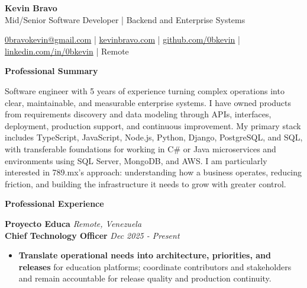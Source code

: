 \documentclass[10pt]{article}
\newcommand{\sectiontitle}[1]{%
    \vspace{4pt}
    \begin{center}
        \textbf{#1}
    \end{center}
    \vspace{-5pt}
}
\begin{document}
\raggedright

\begin{center}
    {\LARGE \textbf{Kevin Bravo}}\\
    Mid/Senior Software Developer | Backend and Enterprise Systems \\
    \hrulefill
\end{center}

\begin{center}
    \href{mailto:0bravokevin@gmail.com}{0bravokevin@gmail.com}
    | \href{https://kevinbravo.com}{kevinbravo.com}
    | \href{https://github.com/0bkevin}{github.com/0bkevin}
    | \href{https://www.linkedin.com/in/0bkevin/}{linkedin.com/in/0bkevin}
    | Remote
\end{center}

\fontsize{10}{11.3}\selectfont

\sectiontitle{Professional Summary}
Software engineer with 5 years of experience turning complex operations into clear, maintainable, and measurable enterprise systems. I have owned products from requirements discovery and data modeling through APIs, interfaces, deployment, production support, and continuous improvement. My primary stack includes TypeScript, JavaScript, Node.js, Python, Django, PostgreSQL, and SQL, with transferable foundations for working in C\# or Java microservices and environments using SQL Server, MongoDB, and AWS. I am particularly interested in 789.mx's approach: understanding how a business operates, reducing friction, and building the infrastructure it needs to grow with greater control.

\sectiontitle{Professional Experience}

\textbf{Proyecto Educa} \hfill \textit{Remote, Venezuela} \\
\textbf{Chief Technology Officer} \hfill \textit{Dec 2025 - Present}
\begin{itemize}
    \item \textbf{Translate operational needs into architecture, priorities, and releases} for education platforms; coordinate contributors and stakeholders and remain accountable for release quality and production continuity.
\end{itemize}
\end{document}
